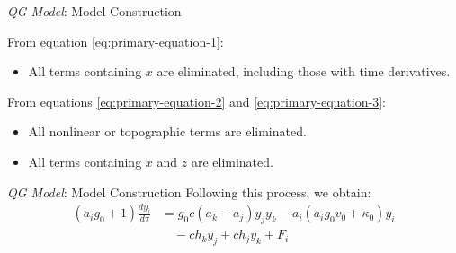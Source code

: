 
\begin{frame}{\textit{QG Model}: Model Construction}
	
	From equation \eqref{eq:primary-equation-1}:
	\begin{itemize}
		\item All terms containing $x$ are eliminated, including those with time derivatives.
	\end{itemize}
	
	From equations \eqref{eq:primary-equation-2} and \eqref{eq:primary-equation-3}:
	\begin{itemize}
		\item All nonlinear or topographic terms are eliminated.
		\item All terms containing $x$ and $z$ are eliminated.
	\end{itemize}
	
\end{frame}


\begin{frame}{\textit{QG Model}: Model Construction}
	Following this process, we obtain:
	\begin{align}
		(a_ig_0 + 1)\frac{dy_i}{d\tau} & = g_0c(a_k - a_j)y_jy_k - a_i(a_ig_0v_0 + \kappa_0)y_i\nonumber \\ 
		                               & \quad - ch_ky_j + ch_jy_k + F_i \label{eq:qg-model}             
	\end{align}
	
\end{frame}